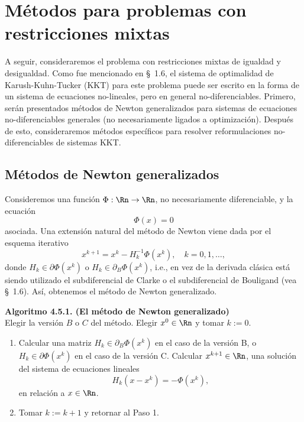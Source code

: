 
\section{Métodos para problemas con restricciones mixtas}\label{v2:sec:4.5}

A seguir, consideraremos el problema con restricciones mixtas de igualdad y desigualdad. Como fue mencionado en \S~1.6, el sistema de optimalidad de Karush-Kuhn-Tucker (KKT) para este problema puede ser escrito en la forma de un sistema de ecuaciones no-lineales, pero en general no-diferenciables. Primero, serán presentados métodos de Newton generalizados para sistemas de ecuaciones no-diferenciables generales (no necesariamente ligados a optimización). Después de esto, consideraremos métodos específicos para resolver reformulaciones no-diferenciables de sistemas KKT.

\subsection{Métodos de Newton generalizados}\label{v2:sec:4.5.1}

Consideremos una función $\Phi: \Rn \to \Rn$, no necesariamente diferenciable, y la ecuación
\begin{equation}
    \Phi(x) = 0
    \label{v2:eq:4.129}
\end{equation}
asociada. Una extensión natural del método de Newton viene dada por el esquema iterativo
\begin{equation}
    x^{k+1} = x^k - H_k^{-1} \Phi(x^k), \quad k = 0, 1, \dots,
    \label{v2:eq:4.130}
\end{equation}
donde $H_k \in \partial \Phi(x^k)$ o $H_k \in \partial_B \Phi(x^k)$, i.e., en vez de la derivada clásica está siendo utilizado el subdiferencial de Clarke o el subdiferencial de Bouligand (vea \S~1.6). Así, obtenemos el método de Newton generalizado.

\vspace{0.3cm}
\noindent\textbf{Algoritmo 4.5.1. (El método de Newton generalizado)}\\
Elegir la versión $B$ o $C$ del método. Elegir $x^0 \in \Rn$ y tomar $k:=0$.
\begin{enumerate}
    \item Calcular una matriz $H_k \in \partial_B \Phi(x^k)$ en el caso de la versión B, o $H_k \in \partial \Phi(x^k)$ en el caso de la versión C.
    Calcular $x^{k+1} \in \Rn$, una solución del sistema de ecuaciones lineales
    \[
        H_k(x - x^k) = -\Phi(x^k),
    \]
    en relación a $x \in \Rn$.
    \item Tomar $k:=k+1$ y retornar al Paso 1.
\end{enumerate}
\vspace{0.3cm}

